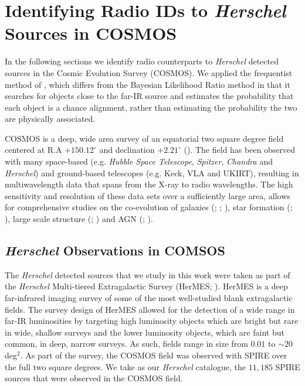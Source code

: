 \section{Identifying Radio IDs to \textit{Herschel} Sources in COSMOS}

In the following sections we identify radio counterparts to \textit{Herschel} detected sources in the Cosmic Evolution Survey (COSMOS). We applied the frequentist method of \citealt{Lilly_1999}, which differs from the Bayesian Likelihood Ratio method in that it searches for objects close to the far-IR source and estimates the probability that each object is a chance alignment, rather than estimating the probability the two are physically associated.

COSMOS is a deep, wide area survey of an equatorial two square degree field centered at R.A $+150.12^{\circ}$ and declination $+2.21^{\circ}$ (\citealt{Scoville_2007}). The field has been observed with many space-based (e.g. \textit{Hubble Space Telescope}, \textit{Spitzer}, \textit{Chandra} and \textit{Herschel}) and ground-based telescopes (e.g. Keck, VLA and UKIRT), resulting in multiwavelength data that spans from the X-ray to radio wavelengths. The high sensitivity and resolution of these data sets over a sufficiently large area, allows for comprehensive studies on the co-evolution of galaxies (\citealt{Schreiber_2018}; \citealt{Stockmann_2020}; \citealt{Valentino_2020a}), star formation (\citealt{Gruppioni_2013}; \citealt{Novak_2017}), large scale structure (\citealt{Scoville_2013}; \citealt{Laigle_2018}) and AGN (\citealt{Prescott_2006}; \citealt{Heintz_2016}). 

\subsection{\textit{Herschel} Observations in COMSOS}

The \textit{Herschel} detected sources that we study in this work were taken as part of the \textit{Herschel} Multi-tiered Extragalactic Survey (HerMES; \citealt{Oliver_2012}). HerMES is a deep far-infrared imaging survey of some of the most well-studied blank extragalactic fields. The survey design of HerMES allowed for the detection of a wide range in far-IR luminosities by targeting high luminosity objects which are bright but rare in wide, shallow surveys and the lower luminosity objects, which are faint but common, in deep, narrow surveys. As such, fields range in size from $0.01$ to $\sim 20\,$deg$^2$. As part of the survey, the COSMOS field was observed with SPIRE over the full two square degrees. We take as our \textit{Herschel} catalogue, the $11,185$ SPIRE sources that were observed in the COSMOS field.

